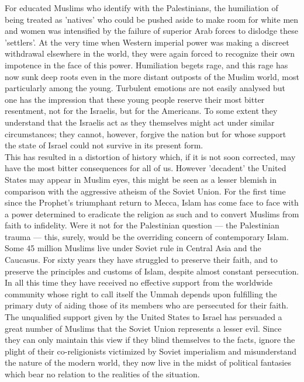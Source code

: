 \documentclass[10pt, twoside]{book}
\begin{document}
For educated Muslims who identify with the Palestinians, the humiliation of being treated as 'natives' who could be pushed aside to make room for white men and women was intensified by the failure of superior Arab forces to dislodge these 'settlers'. At the very time when Western imperial power was making a discreet withdrawal elsewhere in the world, they were again forced to recognize their own impotence in the face of this power. Humiliation begets rage, and this rage has now sunk deep roots even in the more distant outposts of the Muslim world, most particularly among the young. Turbulent emotions are not easily analysed but one has the impression that these young people reserve their most bitter resentment, not for the Israelis, but for the Americans. To some extent they understand that the Israelis act as they themselves might act under similar circumstances; they cannot, however, forgive the nation but for whose support the state of Israel could not survive in its present form. \\

This has resulted in a distortion of history which, if it is not soon corrected, may have the most bitter consequences for all of us. However 'decadent' the United States may appear in Muslim eyes, this might be seen as a lesser blemish in comparison with the aggressive atheism of the Soviet Union. For the first time since the Prophet's triumphant return to Mecca, Islam has come face to face with a power determined to eradicate the religion as such and to convert Muslims from faith to infidelity. Were it not for the Palestinian question --- the Palestinian trauma --- this, surely, would be the overriding concern of contemporary Islam. Some 45 million Muslims live under Soviet rule in Central Asia and the Caucasus. For sixty years they have struggled to preserve their faith, and to preserve the principles and customs of Islam, despite almost constant persecution. In all this time they have received no effective support from the worldwide community whose right to call itself the Ummah depends upon fulfilling the primary duty of aiding those of its members who are persecuted for their faith. \\

The unqualified support given by the United States to Israel has persuaded a great number of Muslims that the Soviet Union represents a lesser evil. Since they can only maintain this view if they blind themselves to the facts, ignore the plight of their co\hyp{}religionists victimized by Soviet imperialism and misunderstand the nature of the modern world, they now live in the midst of political fantasies which bear no relation to the realities of the situation. \\
\end{document}
